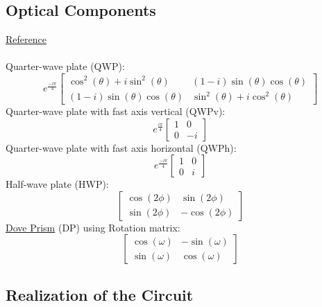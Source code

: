 \documentclass{article}
\begin{document}
\subsection{Optical Components}
\href{https://en.wikipedia.org/wiki/Jones_calculus#Phase_retarders}{Reference} \\ \\
Quarter-wave plate (QWP):
\begin{equation*}
	e^{\frac{-i \pi}{4}}
	\begin{bmatrix}
		\cos^2 (\theta) + i \sin^2 (\theta) & (1-i) \sin(\theta)\cos(\theta)     \\
		(1-i) \sin(\theta)\cos(\theta)      & \sin^2 (\theta) + i \cos^2(\theta)
	\end{bmatrix}
\end{equation*}
Quarter-wave plate with fast axis vertical (QWPv):
\begin{equation*}
	e^{\frac{i \pi}{4}}
	\begin{bmatrix}
		1 & 0  \\
		0 & -i
	\end{bmatrix}
\end{equation*}
Quarter-wave plate with fast axis horizontal (QWPh):
\begin{equation*}
	e^{\frac{-i \pi}{4}}
	\begin{bmatrix}
		1 & 0 \\
		0 & i
	\end{bmatrix}
\end{equation*}
Half-wave plate (HWP):
\begin{equation*}
	\begin{bmatrix}
		\cos(2\phi) & \sin(2\phi)  \\
		\sin(2\phi) & -\cos(2\phi)
	\end{bmatrix}
\end{equation*}
\href{https://www.thorlabs.com/newgrouppage9.cfm?objectgroup_id=146}{Dove Prism} (DP) using Rotation matrix:
\begin{equation*}
	\begin{bmatrix}
		\cos(\omega) & -\sin(\omega) \\
		\sin(\omega) & \cos(\omega)
	\end{bmatrix}
\end{equation*}
\subsection{Realization of the Circuit}
\end{document}
